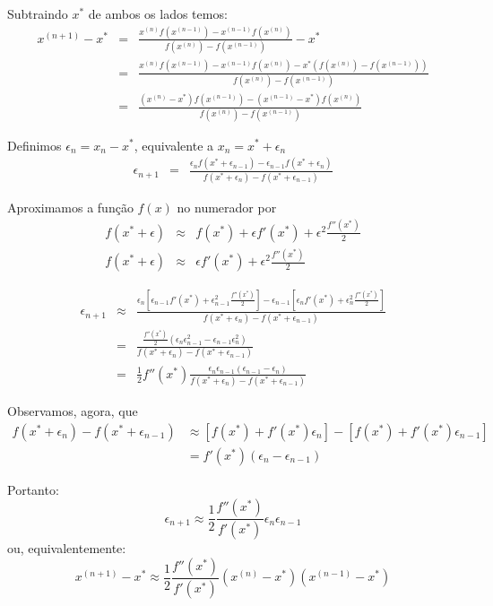 \begin{ex}
\begin{resp}
Subtraindo $x^*$ de ambos os lados temos:
\begin{eqnarray}
x^{(n+1)}-x^*
 &=&\frac{x^{(n)} f(x^{(n-1)})-x^{(n-1)}f(x^{(n)})}{f(x^{(n)})-f(x^{(n-1)})}-x^*\\
 &=&\frac{x^{(n)} f(x^{(n-1)})-x^{(n-1)}f(x^{(n)})-x^*\left(f(x^{(n)})-f(x^{(n-1)})\right)}{f(x^{(n)})-f(x^{(n-1)})}\\
 &=&\frac{(x^{(n)}-x^*) f(x^{(n-1)})-(x^{(n-1)}-x^*)f(x^{(n)})}{f(x^{(n)})-f(x^{(n-1)})}
\end{eqnarray}

Definimos $\epsilon_n=x_n-x^*$, equivalente a $x_n=x^*+\epsilon_n$
\begin{eqnarray}
\epsilon_{n+1}
 &=&\frac{\epsilon_n f(x^*+\epsilon_{n-1})-\epsilon_{n-1}f(x^*+\epsilon_n)}{f(x^*+\epsilon_n)-f(x^*+\epsilon_{n-1})}
\end{eqnarray}

Aproximamos a função $f(x)$ no numerador por
\begin{eqnarray}
f(x^*+\epsilon)&\approx& f(x^*)+\epsilon f'(x^*) + \epsilon^2 \frac{f''(x^*)}{2}\\
f(x^*+\epsilon)&\approx& \epsilon f'(x^*) + \epsilon^2 \frac{f''(x^*)}{2}
\end{eqnarray}

\begin{eqnarray}
\epsilon_{n+1} &\approx&\frac{\epsilon_n \left[\epsilon_{n-1} f'(x^*) + \epsilon_{n-1}^2 \frac{f''(x^*)}{2}\right]-\epsilon_{n-1}\left[\epsilon_{n} f'(x^*) + \epsilon_{n}^2 \frac{f''(x^*)}{2}\right]}{f(x^*+\epsilon_n)-f(x^*+\epsilon_{n-1})}\\
&=&\frac{\frac{f''(x^*)}{2}\left(\epsilon_{n}\epsilon_{n-1}^2-\epsilon_{n-1}\epsilon_{n}^2\right)}{f(x^*+\epsilon_n)-f(x^*+\epsilon_{n-1})}\\
&=&\frac{1}{2}f''(x^*)\frac{\epsilon_{n}\epsilon_{n-1}\left(\epsilon_{n-1}-\epsilon_{n}\right)}{f(x^*+\epsilon_n)-f(x^*+\epsilon_{n-1})}
\end{eqnarray}

Observamos, agora, que
\begin{equation}
  \begin{split}
  f(x^*+\epsilon_n)-f(x^*+\epsilon_{n-1}) &\approx \left[f(x^*)+f'(x^*)\epsilon_n\right]-\left[f(x^*)+f'(x^*)\epsilon_{n-1}\right] \\
  &=f'(x^*)(\epsilon_n-\epsilon_{n-1})
  \end{split}
\end{equation}

Portanto:
\begin{equation}
  \epsilon_{n+1}\approx \frac{1}{2}\frac{f''(x^*)}{f'(x^*)} \epsilon_n \epsilon_{n-1}
\end{equation}
ou, equivalentemente:
\begin{equation}
  x^{(n+1)}-x^*\approx \frac{1}{2}\frac{f''(x^*)}{f'(x^*)} \left(x^{(n)}-x^*\right) \left(x^{(n-1)}-x^*\right)
\end{equation}
\end{resp}


\end{ex}
